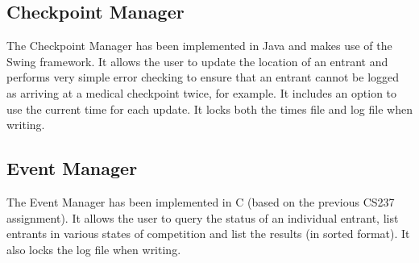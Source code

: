 \documentclass[a4paper, twoside]{article}
\begin{document}
\subsection{Checkpoint Manager}
The Checkpoint Manager has been implemented in Java and makes use of the Swing
framework. It allows the user to update the location of an entrant and performs
very simple error checking to ensure that an entrant cannot be logged as
arriving at a medical checkpoint twice, for example. It includes an option to
use the current time for each update. It locks both the times file and log file
when writing.
\subsection{Event Manager}
The Event Manager has been implemented in C (based on the previous CS237
assignment). It allows the user to query the status of an individual entrant,
list entrants in various states of competition and list the results (in sorted
format). It also locks the log file when writing.
\end{document}
